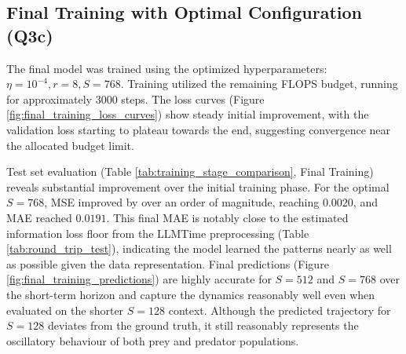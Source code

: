\documentclass{article}
\begin{document}
\subsection{Final Training with Optimal Configuration (Q3c)}

The final model was trained using the optimized hyperparameters: $\eta=10^{-4}, r=8, S=768$. Training utilized the remaining FLOPS budget, running for approximately 3000 steps. The loss curves (Figure \ref{fig:final_training_loss_curves}) show steady initial improvement, with the validation loss starting to plateau towards the end, suggesting convergence near the allocated budget limit.

Test set evaluation (Table \ref{tab:training_stage_comparison}, Final Training) reveals substantial improvement over the initial training phase. For the optimal $S=768$, MSE improved by over an order of magnitude, reaching $0.0020$, and MAE reached $0.0191$. This final MAE is notably close to the estimated information loss floor from the LLMTime preprocessing (Table \ref{tab:round_trip_test}), indicating the model learned the patterns nearly as well as possible given the data representation. Final predictions (Figure \ref{fig:final_training_predictions}) are highly accurate for $S=512$ and $S=768$ over the short-term horizon and capture the dynamics reasonably well even when evaluated on the shorter $S=128$ context. Although the predicted trajectory for $S=128$ deviates from the ground truth, it still reasonably represents the oscillatory behaviour of both prey and predator populations.
\end{document}
